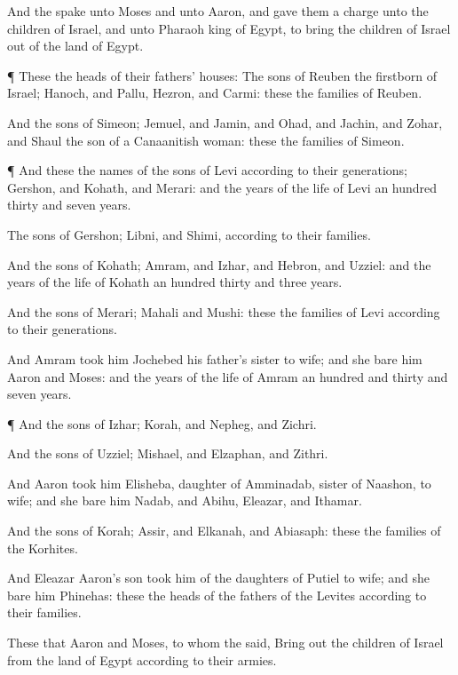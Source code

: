 {And the
{}
spake unto
Moses and unto
Aaron, and gave them a
charge unto the
children of
Israel, and unto
Pharaoh
king of
Egypt, to
bring the
children of
Israel out of the
land of
Egypt.


\par }{\PP {}¶ These
{} the
heads of their
fathers’
houses: The
sons of
Reuben the
firstborn of
Israel;
Hanoch, and
Pallu,
Hezron, and
Carmi: these
{} the
families of
Reuben.

And the
sons of
Simeon;
Jemuel, and
Jamin, and
Ohad, and
Jachin, and
Zohar, and
Shaul the
son of a Canaanitish
woman: these
{} the
families of
Simeon.


\par }{\PP {}¶ And these
{} the
names of the
sons of
Levi according to their
generations;
Gershon, and
Kohath, and
Merari: and the
years of the
life of
Levi
{} an
hundred
thirty and
seven
years.

The
sons of
Gershon;
Libni, and
Shimi, according to their
families.

And the
sons of
Kohath;
Amram, and
Izhar, and
Hebron, and
Uzziel: and the
years of the
life of
Kohath
{} an
hundred
thirty and
three
years.

And the
sons of
Merari;
Mahali and
Mushi: these
{} the
families of
Levi according to their
generations.

And
Amram
took him
Jochebed his
father’s sister to
wife; and she
bare him
Aaron and
Moses: and the
years of the
life of
Amram
{} an
hundred and
thirty and
seven
years.


\par }{\PP {}¶ And the
sons of
Izhar;
Korah, and
Nepheg, and
Zichri.

And the
sons of
Uzziel;
Mishael, and
Elzaphan, and
Zithri.

And
Aaron
took him
Elisheba,
daughter of
Amminadab,
sister of
Naashon, to
wife; and she
bare him
Nadab, and
Abihu,
Eleazar, and
Ithamar.

And the
sons of
Korah;
Assir, and
Elkanah, and
Abiasaph: these
{} the
families of the
Korhites.

And
Eleazar
Aaron’s
son
took him
{} of the
daughters of
Putiel to
wife; and she
bare him
Phinehas: these
{} the
heads of the
fathers of the
Levites according to their
families.

These
{} that
Aaron and
Moses, to
whom the
{}
said, Bring
out the
children of
Israel from the
land of
Egypt according to their
armies.

}
